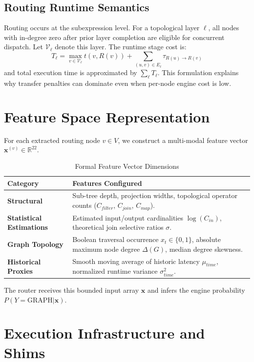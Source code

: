 \documentclass[conference]{IEEEtran}
\begin{document}
\subsection{Routing Runtime Semantics}
Routing occurs at the subexpression level. For a topological layer $\ell$, all nodes with in-degree zero after prior layer completion are eligible for concurrent dispatch. Let $\mathcal{V}_\ell$ denote this layer. The runtime stage cost is:
\begin{equation}
T_\ell = \max_{v \in \mathcal{V}_\ell} t(v, R(v)) + \sum_{(u,v) \in E_\ell} \tau_{R(u) \to R(v)}
\end{equation}
and total execution time is approximated by $\sum_{\ell} T_\ell$. This formulation explains why transfer penalties can dominate even when per-node engine cost is low.

\section{Feature Space Representation}
For each extracted routing node $v \in V$, we construct a multi-modal feature vector $\mathbf{x}^{(v)} \in \mathbb{R}^{22}$.

\begin{table}[h]
\centering
\caption{Formal Feature Vector Dimensions}
\label{tab:features}
\begin{tabularx}{\columnwidth}{lX}
\toprule
Category & Features Configured \\
\midrule
\textbf{Structural} & Sub-tree depth, projection widths, topological operator counts ($C_{filter}$, $C_{join}$, $C_{map}$). \\
\textbf{Statistical Estimations} & Estimated input/output cardinalities $\log(C_{in})$, theoretical join selective ratios $\sigma$. \\
\textbf{Graph Topology} & Boolean traversal occurrence $x_t \in \{0, 1\}$, absolute maximum node degree $\Delta(G)$, median degree skewness. \\
\textbf{Historical Proxies} & Smooth moving average of historic latency $\mu_{time}$, normalized runtime variance $\sigma^2_{time}$. \\
\bottomrule
\end{tabularx}
\end{table}

The router receives this bounded input array $\mathbf{x}$ and infers the engine probability $P(Y=\text{GRAPH}|\mathbf{x})$.

\section{Execution Infrastructure and Shims}
\end{document}
